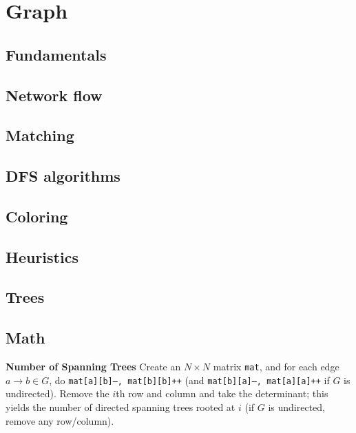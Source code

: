 \chapter{Graph}

\section{Fundamentals}

\section{Network flow}

\section{Matching}

\section{DFS algorithms}

\section{Coloring}

\section{Heuristics}

\section{Trees}

\section{Math}
\textbf{Number of Spanning Trees}
Create an $N\times N$ matrix \texttt{mat}, and for each edge $a \rightarrow b \in G$, do
\texttt{mat[a][b]--, mat[b][b]++} (and \texttt{mat[b][a]--, mat[a][a]++} if $G$ is undirected).
Remove the $i$th row and column and take the determinant; this yields the number of directed spanning trees rooted at $i$
(if $G$ is undirected, remove any row/column).

